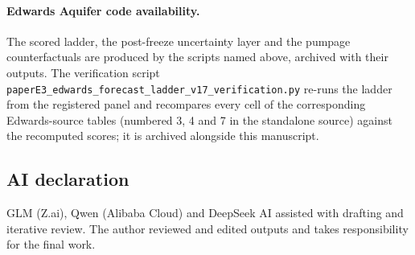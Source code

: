 \documentclass[11pt]{article}
\begin{document}
\paragraph{Edwards Aquifer code availability.}
The scored ladder, the post-freeze uncertainty layer and the pumpage
counterfactuals are produced by the scripts named above, archived with
their outputs. The verification script
\texttt{paperE3\_edwards\_forecast\_ladder\_v17\_verification.py}
re-runs the ladder from the registered panel and recompares every cell of the corresponding Edwards-source tables (numbered 3, 4 and 7 in the standalone source) against the recomputed scores; it is archived
alongside this manuscript.

\subsection*{AI declaration}
GLM (Z.ai), Qwen (Alibaba Cloud) and DeepSeek AI assisted with drafting
and iterative review. The author reviewed and edited outputs and takes
responsibility for the final work.
\end{document}
